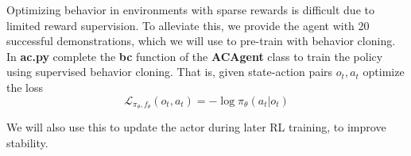 \item {} 

Optimizing behavior in environments with sparse rewards is difficult due to limited reward supervision. To alleviate this, we provide the agent with 20 successful demonstrations, which we will use to pre-train with behavior cloning. In \textbf{ac.py} complete the \textbf{bc} function of the \textbf{ACAgent} class to train the policy using supervised behavior cloning. That is, given state-action pairs $o_t, a_t$ optimize the loss $$\mathcal{L}_{\pi_{\theta}, f_{\theta}}(o_t, a_t) = -\log \pi_{\theta}(a_t|o_t)$$

We will also use this to update the actor during later RL training, to improve stability.
